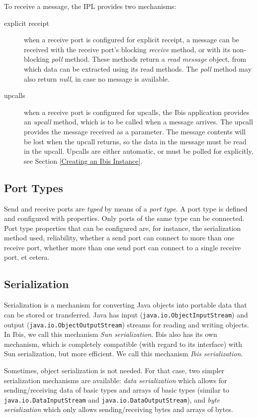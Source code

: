 \documentclass[10pt]{article}
\newcommand{\mysubsection}[1]{\subsection{#1}\label{#1}}
\begin{document}
To receive a message, the IPL provides two mechanisms:
\begin{description}
\item[explicit receipt]
when a receive port is configured for explicit receipt, a message can be
received with the receive port's blocking \emph{receive} method,
or with its non-blocking \emph{poll} method.
These methods return a \emph{read message} object, from which data can
be extracted using its read methods. The \emph{poll} method may also
return \emph{null}, in case no message is available.
\item[upcalls]
when a receive port is configured for upcalls, the Ibis application provides
an \emph{upcall} method, which is to be called when a message arrives.
The upcall provides the message received as a parameter.
The message contents will be lost when the upcall returns, so the data
in the message must be read in the upcall.
Upcalls are either automatic, or must be polled for explicitly, see Section
\ref{Creating an Ibis Instance}.
\end{description}
\noindent

\mysubsection{Port Types}

Send and receive ports are \emph{typed} by means of a \emph{port type}.
A port type is defined and configured with properties.
Only ports of the same type can be connected.
Port type properties that can be configured are, for instance, the
serialization method used, reliability, whether a send port can connect
to more than one receive port, whether more than one send port can connect
to a single receive port, et cetera.

\mysubsection{Serialization}

Serialization is a mechanism for converting Java objects
into portable data that can be stored or transferred.
Java has input
(\texttt{java.io.ObjectInputStream})
and output
(\texttt{java.io.ObjectOutputStream})
streams for reading and writing
objects.
In Ibis, we call this mechanism \emph{Sun serialization}.
Ibis also has its own mechanism, which is completely compatible (with
regard to its interface) with Sun serialization, but more efficient.
We call this mechanism \emph{Ibis serialization}.

Sometimes, object serialization is not needed. For that case,
two simpler serialization mechanisms are available: \emph{data
serialization} which allows for sending/receiving data of basic types
and arrays of basic types (similar to \texttt{java.io.DataInputStream}
and \texttt{java.io.DataOutputStream}), and \emph{byte serialization}
which only allows sending/receiving bytes and arrays of bytes.
\end{document}
